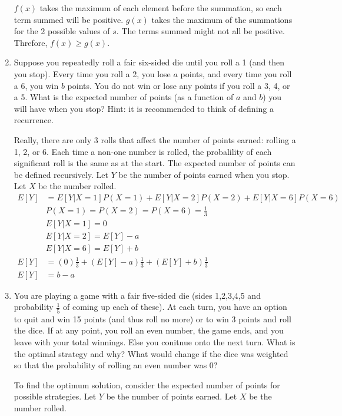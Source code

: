 \documentclass[10pt]{article}
\begin{document}
\begin{enumerate}[label=(\alph*)]
  $f(x)$ takes the maximum of each element before the summation, so each term summed will be positive. $g(x)$ takes the maximum of the summations for the 2 possible values of $s$. The terms summed might not all be positive. Threfore, $f(x) \geq g(x)$.
  
  \item Suppose you repeatedly roll a fair six-sided die until you roll a 1 (and then you stop). Every time you roll a 2, you lose $a$ points, and every time you roll a 6, you win $b$ points. You do not win or lose any points if you roll a 3, 4, or a 5. What is the expected number of points (as a function of $a$ and $b$) you will have when you stop? Hint: it is recommended to think of defining a recurrence.
  
  Really, there are only 3 rolls that affect the number of points earned: rolling a 1, 2, or 6. Each time a non-one number is rolled, the probalility of each significant roll is the same as at the start. The expected number of points can be defined recursively. Let $Y$ be the number of points earned when you stop. Let $X$ be the number rolled.
  \begin{align*}
  E[Y] &= E[Y|X = 1]P(X = 1) + E[Y|X = 2]P(X = 2) + E[Y|X = 6]P(X = 6)\\
  & P(X = 1) = P(X = 2) = P(X = 6) = \frac{1}{3}\\
  & E[Y|X = 1] = 0\\
  & E[Y|X = 2] = E[Y] - a\\
  & E[Y|X = 6] = E[Y] + b\\
  E[Y] &= (0)\frac{1}{3} + (E[Y] - a)\frac{1}{3} + (E[Y] + b)\frac{1}{3}\\
  E[Y] &= b - a
  \end{align*}
  
  \item You are playing a game with a fair five-sided die (sides 1,2,3,4,5 and probability $\frac{1}{5}$ of coming up each of these). At each turn, you have an option to quit and win 15 points (and thus roll no more) or to win 3 points and roll the dice. If at any point, you roll an even number, the game ends, and you leave with your total winnings. Else you conitnue onto the next turn. What is the optimal strategy and why? What would change if the dice was weighted so that the probability of rolling an even number was 0?
  
  To find the optimum solution, consider the expected number of points for possible strategies. Let $Y$ be the number of points earned. Let $X$ be the number rolled.
  

\end{enumerate}
\end{document}
